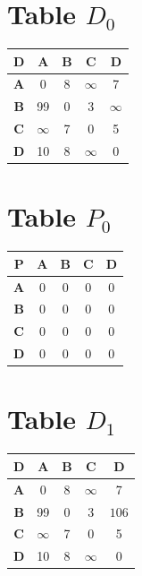 \documentclass{article}
\begin{document}
\section{Table $D_{0}$}
\begin{center}
    \begin{tabular}{|c||c|c|c|c|}
        \hline
        \textbf{D} & \textbf{A} & \textbf{B} & \textbf{C} & \textbf{D} \\
        \hline
        \hline
        \textbf{A}& 0 & 8 & $\infty$ & 7 \\
        \hline
        \textbf{B}& 99 & 0 & 3 & $\infty$ \\
        \hline
        \textbf{C}& $\infty$ & 7 & 0 & 5 \\
        \hline
        \textbf{D}& 10 & 8 & $\infty$ & 0 \\
        \hline
    \end{tabular}
\end{center}


\section{Table $P_{0}$}
\begin{center}
    \begin{tabular}{|c||c|c|c|c|}
        \hline
        \textbf{P} & \textbf{A} & \textbf{B} & \textbf{C} & \textbf{D} \\
        \hline
        \hline
        \textbf{A}& 0 & 0 & 0 & 0 \\
        \hline
        \textbf{B}& 0 & 0 & 0 & 0 \\
        \hline
        \textbf{C}& 0 & 0 & 0 & 0 \\
        \hline
        \textbf{D}& 0 & 0 & 0 & 0 \\
        \hline
    \end{tabular}
\end{center}


\section{Table $D_{1}$}
\begin{center}
    \begin{tabular}{|c||c|c|c|c|}
        \hline
        \textbf{D} & \textbf{A} & \textbf{B} & \textbf{C} & \textbf{D} \\
        \hline
        \hline
        \textbf{A}& 0 & 8 & $\infty$ & 7 \\
        \hline
        \textbf{B}& 99 & 0 & 3 & \cellcolor[HTML]{D74894}$106$ \\
        \hline
        \textbf{C}& $\infty$ & 7 & 0 & 5 \\
        \hline
        \textbf{D}& 10 & 8 & $\infty$ & 0 \\
        \hline
    \end{tabular}
\end{center}
\end{document}
